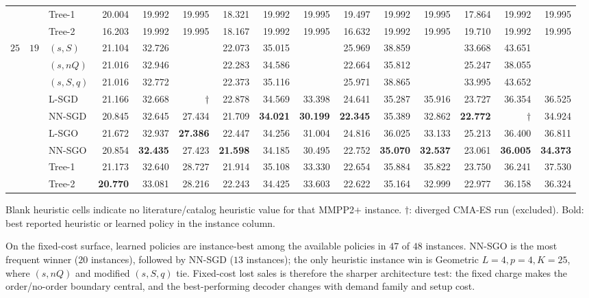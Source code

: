 \documentclass[11pt]{article}
\begin{document}
\begin{table}[!htbp]
{\begin{tabular}{lllrrrrrrrrrrrr}
 &  & Tree-1 & 20.004 & 19.992 & 19.995 & 18.321 & 19.992 & 19.995 & 19.497 & 19.992 & 19.995 & 17.864 & 19.992 & 19.995 \\
 &  & Tree-2 & 16.203 & 19.992 & 19.995 & 18.167 & 19.992 & 19.995 & 16.632 & 19.992 & 19.995 & 19.710 & 19.992 & 19.995 \\
\addlinespace
$25$ & $19$ & $(s,S)$ & 21.104 & 32.726 &  & 22.073 & 35.015 &  & 25.969 & 38.859 &  & 33.668 & 43.651 &  \\
 &  & $(s,nQ)$ & 21.016 & 32.946 &  & 22.283 & 34.586 &  & 22.664 & 35.812 &  & 25.247 & 38.055 &  \\
 &  & $(s,S,q)$ & 21.016 & 32.772 &  & 22.373 & 35.116 &  & 25.971 & 38.865 &  & 33.995 & 43.652 &  \\
 &  & L-SGD & 21.166 & 32.668 & $\dagger$ & 22.878 & 34.569 & 33.398 & 24.641 & 35.287 & 35.916 & 23.727 & 36.354 & 36.525 \\
 &  & NN-SGD & 20.845 & 32.645 & 27.434 & 21.709 & \textbf{34.021} & \textbf{30.199} & \textbf{22.345} & 35.389 & 32.862 & \textbf{22.772} & $\dagger$ & 34.924 \\
 &  & L-SGO & 21.672 & 32.937 & \textbf{27.386} & 22.447 & 34.256 & 31.004 & 24.816 & 36.025 & 33.133 & 25.213 & 36.400 & 36.811 \\
 &  & NN-SGO & 20.854 & \textbf{32.435} & 27.423 & \textbf{21.598} & 34.185 & 30.495 & 22.752 & \textbf{35.070} & \textbf{32.537} & 23.061 & \textbf{36.005} & \textbf{34.373} \\
 &  & Tree-1 & 21.173 & 32.640 & 28.727 & 21.914 & 35.108 & 33.330 & 22.654 & 35.884 & 35.822 & 23.750 & 36.241 & 37.530 \\
 &  & Tree-2 & \textbf{20.770} & 33.081 & 28.216 & 22.243 & 34.425 & 33.603 & 22.622 & 35.164 & 32.999 & 22.977 & 36.158 & 36.324 \\
\bottomrule
\end{tabular}}
\par\medskip\footnotesize Blank heuristic cells indicate no literature/catalog heuristic value for that MMPP2$+$ instance. $\dagger$: diverged CMA-ES run (excluded). Bold: best reported heuristic or learned policy in the instance column.
\end{table}
\FloatBarrier

On the fixed-cost surface, learned policies are instance-best among the
available policies in $47$ of $48$ instances. NN-SGO is the most frequent winner ($20$ instances),
followed by NN-SGD ($13$ instances); the only heuristic instance win is Geometric $L=4,p=4,K=25$,
where $(s,nQ)$ and modified $(s,S,q)$ tie. Fixed-cost
lost sales is therefore the sharper architecture test: the fixed charge makes the order/no-order
boundary central, and the best-performing decoder changes with demand family and setup cost.
\end{document}
